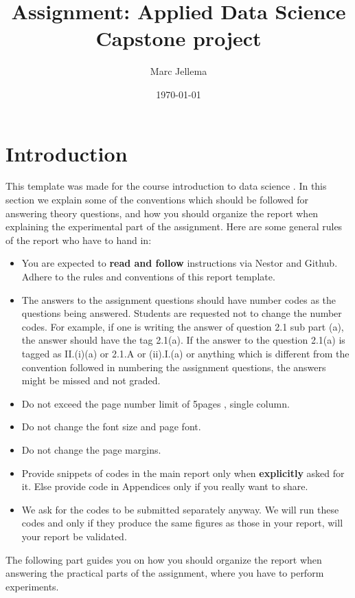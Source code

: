 \documentclass[a4paper]{article}
\title{Assignment: Applied Data Science Capstone project}
\author{Marc Jellema} \date{\today}
\begin{document}
\maketitle

\section*{Introduction}
This template was made for the course introduction to data science \cite{IDS2017}. 
In this section we explain some of the conventions which should be followed for answering theory questions, and how you should organize the report when explaining the experimental part of the 
assignment. Here are some general rules of the report who have to hand in:
\begin{itemize}
 \item You are expected to \textbf{read and follow} instructions via Nestor and Github. Adhere to the rules and conventions of this report template.
 \item The answers to the assignment questions should have number codes as the questions being answered. Students are requested not to change the number codes. For example, if one is writing the 
answer of question 2.1 sub part (a), the answer should have the tag 2.1(a). If the answer to the question 2.1(a) is tagged as II.(i)(a) or 2.1.A or (ii).I.(a) or anything which is different 
from the convention followed in numbering the assignment questions, the answers might be missed and not graded.
\item Do not exceed the page number limit of 5pages , single column.
\item Do not change the font size and page font.
\item Do not change the page margins.
\item Provide snippets of codes in the main report only when \textbf{explicitly} asked for it. Else provide code in Appendices only if you really want to share. 
\item We ask for the codes to be submitted separately anyway. We will run these codes and only if they produce the same figures as those in your report, will your report be validated.
\end{itemize}
The following part guides you on how you should organize the report when answering the practical parts of the assignment, where you have to perform experiments.
\end{document}
